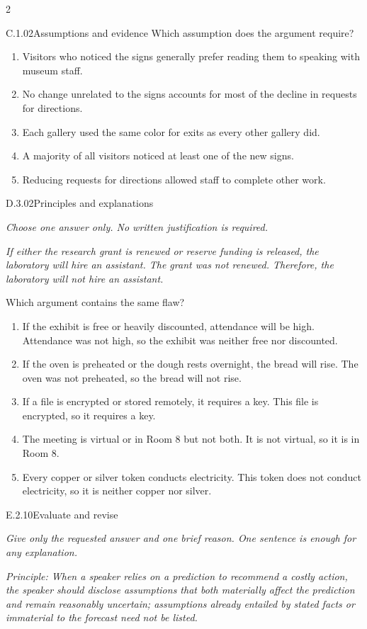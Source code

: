 \documentclass[9pt]{extarticle}
\newcommand{\choice}[1]{\item #1}
\begin{document}
\begin{multicols}{2}
\begin{DenseCoreProblem}{C.1.02}{Assumptions and evidence}
Which assumption does the argument require?
\begin{enumerate}[label=(\alph*)]
  \choice{Visitors who noticed the signs generally prefer reading them to speaking with museum staff.}
  \choice{No change unrelated to the signs accounts for most of the decline in requests for directions.}
  \choice{Each gallery used the same color for exits as every other gallery did.}
  \choice{A majority of all visitors noticed at least one of the new signs.}
  \choice{Reducing requests for directions allowed staff to complete other work.}
\end{enumerate}
\end{DenseCoreProblem}
\begin{DenseCoreProblem}{D.3.02}{Principles and explanations}
{\scriptsize\textit{Choose one answer only. No written justification is required.}\par}
\emph{If either the research grant is renewed or reserve funding is released, the laboratory will hire an assistant. The grant was not renewed. Therefore, the laboratory will not hire an assistant.}

Which argument contains the same flaw?
\begin{enumerate}[label=(\alph*)]
  \choice{If the exhibit is free or heavily discounted, attendance will be high. Attendance was not high, so the exhibit was neither free nor discounted.}
  \choice{If the oven is preheated or the dough rests overnight, the bread will rise. The oven was not preheated, so the bread will not rise.}
  \choice{If a file is encrypted or stored remotely, it requires a key. This file is encrypted, so it requires a key.}
  \choice{The meeting is virtual or in Room 8 but not both. It is not virtual, so it is in Room 8.}
  \choice{Every copper or silver token conducts electricity. This token does not conduct electricity, so it is neither copper nor silver.}
\end{enumerate}
\end{DenseCoreProblem}
\begin{DenseCoreProblem}{E.2.10}{Evaluate and revise}
{\scriptsize\textit{Give only the requested answer and one brief reason. One sentence is enough for any explanation.}\par}
\emph{Principle: When a speaker relies on a prediction to recommend a costly action, the speaker should disclose assumptions that both materially affect the prediction and remain reasonably uncertain; assumptions already entailed by stated facts or immaterial to the forecast need not be listed.}


\end{DenseCoreProblem}
\end{multicols}
\end{document}
